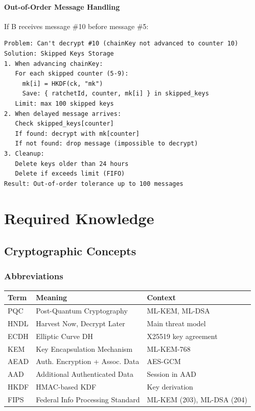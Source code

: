 \documentclass[11pt,a4paper,oneside]{book}
\begin{document}
\vspace{-0.2cm}\subsection{Out-of-Order Message Handling}
If B receives message \#10 before message \#5:
\begin{verbatim}
Problem: Can't decrypt #10 (chainKey not advanced to counter 10)
Solution: Skipped Keys Storage
1. When advancing chainKey:
   For each skipped counter (5-9):
     mk[i] = HKDF(ck, "mk")
     Save: { ratchetId, counter, mk[i] } in skipped_keys
   Limit: max 100 skipped keys
2. When delayed message arrives:
   Check skipped_keys[counter]
   If found: decrypt with mk[counter]
   If not found: drop message (impossible to decrypt)
3. Cleanup:
   Delete keys older than 24 hours
   Delete if exceeds limit (FIFO)
Result: Out-of-order tolerance up to 100 messages
\end{verbatim}
\vspace{-1cm}\part{Required Knowledge}
\vspace{-0.5cm}\chapter{Cryptographic Concepts}
\vspace{-0.3cm}\section{Abbreviations}
\begin{table}[h]
\centering
\begin{tabular}{|l|l|l|}
\hline
\textbf{Term} & \textbf{Meaning} & \textbf{Context} \\
\hline
PQC & Post-Quantum Cryptography & ML-KEM, ML-DSA \\
\hline
HNDL & Harvest Now, Decrypt Later & Main threat model \\
\hline
ECDH & Elliptic Curve DH & X25519 key agreement \\
\hline
KEM & Key Encapsulation Mechanism & ML-KEM-768 \\
\hline
AEAD & Auth. Encryption + Assoc. Data & AES-GCM \\
\hline
AAD & Additional Authenticated Data & Session in AAD \\
\hline
HKDF & HMAC-based KDF & Key derivation \\
\hline
FIPS & Federal Info Processing Standard & ML-KEM (203), ML-DSA (204) \\
\hline
\end{tabular}
\end{table}
\end{document}
